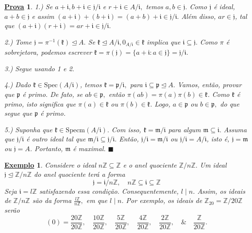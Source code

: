 \documentclass{article}
\newtheorem{example}{\underline{Exemplo}}
\newtheorem*{proof*}{\underline{Prova}}
\renewcommand\qedsymbol{$\blacksquare$}
\begin{document}
\begin{proof*}
  1.) Se \(a+\mathfrak{i}, b+\mathfrak{i}\in \mathfrak{j}/\mathfrak{i}\) e \(r+\mathfrak{i}\in A/\mathfrak{i},\) temos
  \(a, b\in \mathfrak{j}.\) Como \(\mathfrak{j}\) é ideal, \(a+b\in \mathfrak{j}\) e assim \((a+\mathfrak{i}) + (b+\mathfrak{i}) = (a+b)
  +\mathfrak{i}\in \mathfrak{j}/\mathfrak{i}.\) Além disso, \(ar\in \mathfrak{j}\), tal que \((a+\mathfrak{i})(r+\mathfrak{i})=ar + \mathfrak{i}\in
  \mathfrak{j}/\mathfrak{i}.\)

  2.) Tome \(\mathfrak{j} = \pi^{-1}(\mathfrak{k})\trianglelefteq{A}.\) Se \(\mathfrak{k}\trianglelefteq{A/\mathfrak{i}}, 0_{A/\mathfrak{i}}\in \mathfrak{k}\)
  implica que \(\mathfrak{i}\subseteq{\mathfrak{j}}.\) Como \(\pi \) é sobrejetora, podemos escrever
  \(\mathfrak{k} = \pi(\mathfrak{j}) = \{a+\mathfrak{i}: a\in \mathfrak{j}\} = \mathfrak{j}/\mathfrak{i}.\)

  3.) Segue usando 1 e 2.

  4.) Dado \(\mathfrak{k}\in \mathrm{Spec}(A/\mathfrak{i})\), temos \(\mathfrak{k} = \mathfrak{p}/\mathfrak{i},\)
  para \(\mathfrak{i}\subseteq{\mathfrak{p}}\trianglelefteq{A}.\) Vamos, então, provar que \(\mathfrak{p}\) é primo. 
  De fato, se \(ab\in \mathfrak{p},\) então \(\pi (ab)=\pi(a)\pi(b)\in \mathfrak{k}\). Como \(\mathfrak{k}\) é primo,
  isto significa que \(\pi(a)\in \mathfrak{k}\) ou \(\pi(b)\in \mathfrak{k}\). Logo, \(a\in \mathfrak{p}\) ou \(b\in \mathfrak{p},\) do que
  segue que \(\mathfrak{p}\) é primo.

  5.) Suponha que \(\mathfrak{k}\in \mathrm{Specm}(A/\mathfrak{i}).\) Com isso, \(\mathfrak{k} = \mathfrak{m}/\mathfrak{i}\)
  para algum \(\mathfrak{m}\subseteq{\mathfrak{i}}.\) Assuma que \(\mathfrak{j}/\mathfrak{i}\) é outro ideal tal que \(\mathfrak{m}/\mathfrak{i}\subseteq{\mathfrak{j}/\mathfrak{i}}.\)
  Então, \(\mathfrak{j}/\mathfrak{i} = \mathfrak{m}/\mathfrak{i}\) ou \(\mathfrak{j}/\mathfrak{i} = A/\mathfrak{i}\), isto é,
  \(\mathfrak{j} = \mathfrak{m}\) ou \(\mathfrak{j} = A\). Portanto, \(\mathfrak{m} \) é maximal. \qedsymbol
\end{proof*}
\begin{example}
  Considere o ideal \(n \mathbb{Z}\subseteq \mathbb{Z}\) e o anel quociente \(\mathbb{Z}/n \mathbb{Z}.\)
Um ideal \(\mathfrak{j}\trianglelefteq \mathbb{Z}/n \mathbb{Z}\) do anel quociente terá a forma 
  \[
    \mathfrak{j} = \mathfrak{i}/n \mathbb{Z},\quad n \mathbb{Z}\subseteq \mathfrak{i}\subseteq \mathbb{Z}
  \]
  Seja \(\mathfrak{i} = l \mathbb{Z}\) satisfazendo essa condição. Consequentemente, \(l\mid n\). Assim, os ideais de
 \(\mathbb{Z}/n \mathbb{Z}\) são da forma \(\frac{l \mathbb{Z}}{n \mathbb{Z}},\) em que \(l\mid n\). Por exemplo, os ideais
 de \(\mathbb{Z}_{20} = \mathbb{Z}/20 \mathbb{Z}\) serão 
   \[
     (0) = \frac{20 \mathbb{Z}}{20 \mathbb{Z}},\quad \frac{10 \mathbb{Z}}{20 \mathbb{Z}}, \quad \frac{5 \mathbb{Z}}{20 \mathbb{Z}},\quad \frac{4 \mathbb{Z}}{20 \mathbb{Z}}, \quad \frac{2 \mathbb{Z}}{20 \mathbb{Z}}, \quad\&\quad \frac{\mathbb{Z}}{20 \mathbb{Z}}.
   \]
\end{example}
\newpage
\end{document}

